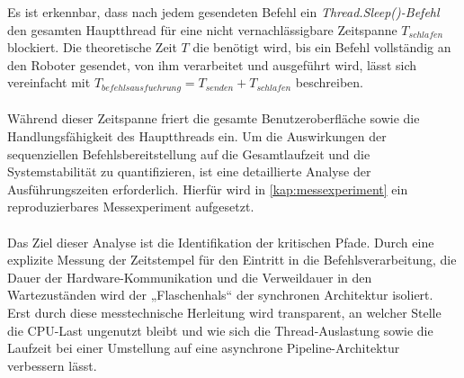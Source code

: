 Es ist erkennbar, dass nach jedem gesendeten Befehl ein \textit{Thread.Sleep()-Befehl} den gesamten Hauptthread für eine nicht vernachlässigbare Zeitspanne $T_{schlafen}$ blockiert. Die theoretische Zeit $T$ die benötigt wird, bis ein Befehl vollständig an den Roboter gesendet, von ihm verarbeitet und ausgeführt wird, lässt sich vereinfacht mit $T_{befehlsausfuehrung} = T_{senden} + T_{schlafen}$ beschreiben.\\
\\Während dieser Zeitspanne friert die gesamte Benutzeroberfläche sowie die Handlungsfähigkeit des Hauptthreads ein. Um die Auswirkungen der sequenziellen Befehlsbereitstellung auf die Gesamtlaufzeit und die Systemstabilität zu quantifizieren, ist eine detaillierte Analyse der Ausführungszeiten erforderlich. Hierfür wird in \ref{kap:messexperiment} ein reproduzierbares Messexperiment aufgesetzt.\\
\\Das Ziel dieser Analyse ist die Identifikation der kritischen Pfade. Durch eine explizite Messung der Zeitstempel für den Eintritt in die Befehlsverarbeitung, die Dauer der Hardware-Kommunikation und die Verweildauer in den Wartezuständen wird der „Flaschenhals“ der synchronen Architektur isoliert. Erst durch diese messtechnische Herleitung wird transparent, an welcher Stelle die CPU-Last ungenutzt bleibt und wie sich die Thread-Auslastung sowie die Laufzeit bei einer Umstellung auf eine asynchrone Pipeline-Architektur verbessern lässt.

